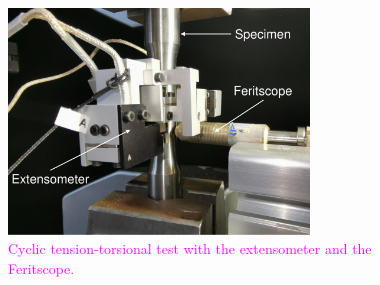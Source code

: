 \documentclass[preprint,5p,twocolumn,10pt,sort&compress]{elsarticle}
\newcommand{\jingyu}[1]{\textcolor{magenta}{#1}}
\begin{document}
\begin{figure}[!htp]
  \begin{center}
  \includegraphics[width=8cm]{TestSetup.pdf}
  \caption{\jingyu{Cyclic tension-torsional test with the extensometer and the Feritscope.}}
  \label{fig:Testsetting}
  \end{center}
\end{figure}
\end{document}
